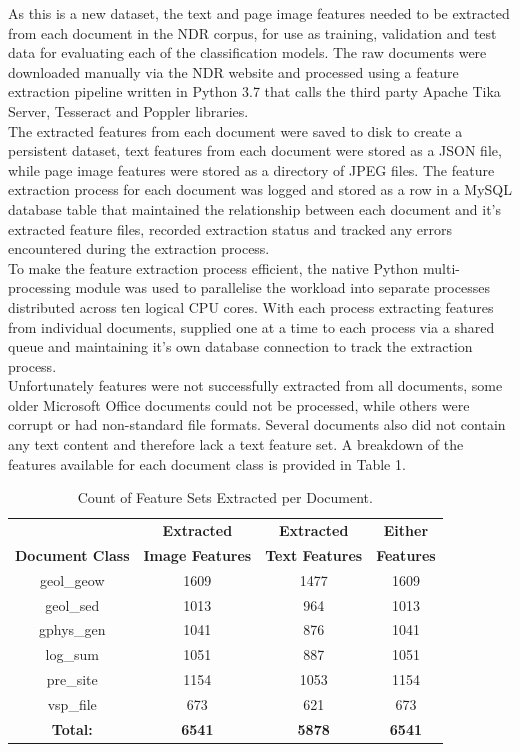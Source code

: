 \documentclass[a4paper,12pt]{article}
\begin{document}
As this is a new dataset, the text and page image features needed to be extracted from each document in the NDR corpus, for use as training, validation and test data for evaluating each of the classification models. The raw documents were downloaded manually via the NDR website and processed using a feature extraction pipeline written in Python 3.7 that calls the third party Apache Tika Server, Tesseract and Poppler libraries. \\

The extracted features from each document were saved to disk to create a persistent dataset, text features from each document were stored as a JSON file, while page image features were stored as a directory of JPEG files. The feature extraction process for each document was logged and stored as a row in a MySQL database table that maintained the relationship between each document and it's extracted feature files, recorded extraction status and tracked any errors encountered during the extraction process. \\

To make the feature extraction process efficient, the native Python multi-processing module was used to parallelise the workload into separate processes distributed across ten logical CPU cores. With each process extracting features from individual documents, supplied one at a time to each process via a shared queue and maintaining it's own database connection to track the extraction process.\\

Unfortunately features were not successfully extracted from all documents, some older Microsoft Office documents could not be processed, while others were corrupt or had non-standard file formats. Several documents also did not contain any text content and therefore lack a text feature set. A breakdown of the features available for each document class is provided in Table 1.\\

\begin{table}[H]
	\centering
	\begin{tabular}{| c | c | c | c |}
	\hline
	&\textbf{Extracted} & \textbf{Extracted} & \textbf{Either}\\
	\textbf{Document Class} & \textbf{Image Features} & \textbf{Text Features} & \textbf{Features}\\
	\hline
	geol\_geow & 1609 & 1477 & 1609\\
	\hline
	geol\_sed & 1013 & 964 & 1013 \\
	\hline
	gphys\_gen & 1041 & 876 & 1041 \\
	\hline
	log\_sum & 1051 & 887 & 1051\\
	\hline
	pre\_site & 1154 & 1053 & 1154\\
	\hline
	vsp\_file & 673 & 621 & 673\\
	\hline
	\textbf{Total:} & \textbf{6541} & \textbf{5878} & \textbf{6541}\\
	\hline
	\end{tabular}
	\caption{\label{tab:table-name}Count of Feature Sets Extracted per Document.}
\end{table}
\end{document}
